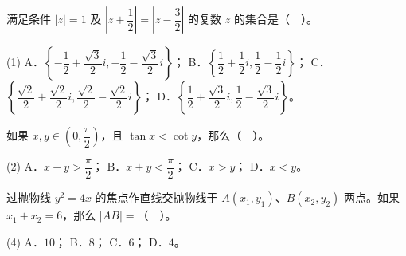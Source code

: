 \begin{question}
满足条件 $|z|=1$ 及 $\left|z+\dfrac12\right|=\left|z-\dfrac32\right|$ 的复数 $z$ 的集合是（　）。

\begin{gkopts}(1)
\task A．$\left\{-\dfrac12+\dfrac{\sqrt3}{2}i,-\dfrac12-\dfrac{\sqrt3}{2}i\right\}$；
\task B．$\left\{\dfrac12+\dfrac12i,\dfrac12-\dfrac12i\right\}$；
\task C．$\left\{\dfrac{\sqrt2}{2}+\dfrac{\sqrt2}{2}i,\dfrac{\sqrt2}{2}-\dfrac{\sqrt2}{2}i\right\}$；
\task D．$\left\{\dfrac12+\dfrac{\sqrt3}{2}i,\dfrac12-\dfrac{\sqrt3}{2}i\right\}$。
\end{gkopts}

\end{question}
\begin{question}
如果 $x,y\in\left(0,\dfrac\pi2\right)$，且 $\tan x<\cot y$，那么（　）。

\begin{gkopts}(2)
\task A．$x+y>\dfrac\pi2$；
\task B．$x+y<\dfrac\pi2$；
\task C．$x>y$；
\task D．$x<y$。
\end{gkopts}

\end{question}
\begin{question}
过抛物线 $y^2=4x$ 的焦点作直线交抛物线于 $A(x_1,y_1)$、$B(x_2,y_2)$ 两点。如果 $x_1+x_2=6$，那么 $|AB|=$（　）。

\begin{gkopts}(4)
\task A．$10$；
\task B．$8$；
\task C．$6$；
\task D．$4$。
\end{gkopts}

\end{question}

